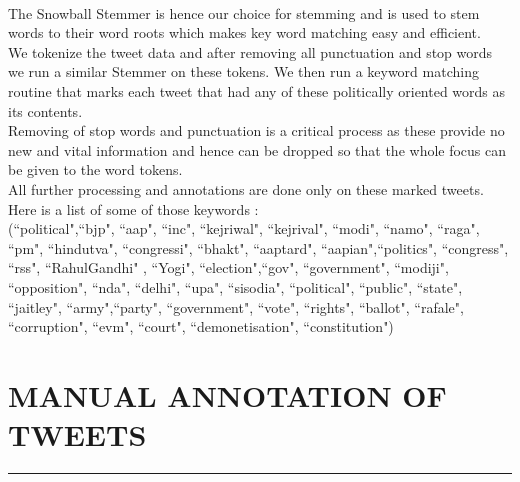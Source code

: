 \documentclass[a4paper,11pt]{article}
\begin{document}
\medskip\\
The Snowball Stemmer is hence our choice for stemming and is used to stem words to their word roots which makes key word matching easy and efficient.
\medskip\\
We tokenize the tweet data and after removing all punctuation and stop words we run a similar Stemmer on these tokens. We then run a keyword matching routine that marks each tweet that had any of these politically oriented words as its contents.
\medskip\\
Removing of stop words and punctuation is a critical process as these provide no new and vital information and hence can be dropped so that the whole focus can be given to the word tokens.
\medskip\\
All further processing and annotations are done only on these marked tweets.
\medskip\\
Here is a list of some of those keywords : 
\medskip\\
(``political",``bjp", ``aap", ``inc", ``kejriwal", ``kejrival", ``modi", ``namo", ``raga", ``pm", ``hindutva", ``congressi", ``bhakt", ``aaptard", ``aapian",``politics", ``congress", ``rss", ``RahulGandhi" , ``Yogi", ``election",``gov", ``government", ``modiji", ``opposition", ``nda", ``delhi", ``upa", ``sisodia", ``political", ``public", ``state", ``jaitley", ``army",``party", ``government", ``vote", ``rights", ``ballot", ``rafale", ``corruption", ``evm", ``court", ``demonetisation", ``constitution")


 
\newpage
\section{MANUAL ANNOTATION OF TWEETS}
\hrule
\vspace*{5mm}
\end{document}

